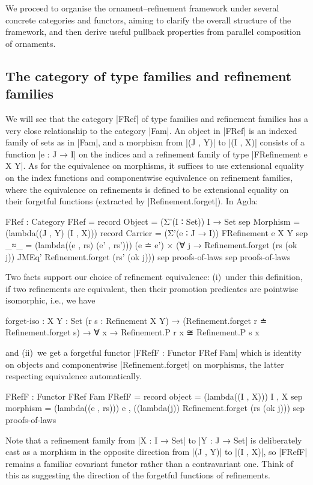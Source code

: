 We proceed to organise the ornament--refinement framework under several concrete categories and functors, aiming to clarify the overall structure of the framework, and then derive useful pullback properties from parallel composition of ornaments.

\subsection{The category of type families and refinement families}
\label{sec:FRef}

We will see that the category |FRef| of type families and refinement families has a very close relationship to the category |Fam|.
An object in |FRef| is an indexed family of sets as in |Fam|, and a morphism from |(J , Y)| to |(I , X)| consists of a function |e : J → I| on the indices and a refinement family of type |FRefinement e X Y|.
As for the equivalence on morphisms, it suffices to use extensional equality on the index functions and componentwise equivalence on refinement families, where the equivalence on refinements is defined to be extensional equality on their forgetful functions (extracted by |Refinement.forget|).
In Agda:
\begin{code}
FRef : Category
FRef = record
  {    Object    =   (Σ'(I ∶ Set)) I → Set
  sep  Morphism  =
         (lambda((J , Y) (I , X))) record
           {    Carrier  =   (Σ'(e ∶ J → I)) FRefinement e X Y
           sep  _≈_      =
                  (lambda((e , rs) (e' , rs')))
                    (e ≐ e') ×
                    (∀ j →  Refinement.forget (rs   (ok j)) JMEq'
                            Refinement.forget (rs'  (ok j)))
           sep  proofs-of-laws }
  sep  proofs-of-laws }
\end{code}
Two facts support our choice of refinement equivalence: (i)~under this definition, if two refinements are equivalent, then their promotion predicates are pointwise isomorphic, i.e., we have
\begin{code}
forget-iso :
  {X Y : Set} (r s : Refinement X Y) →
  (Refinement.forget r ≐ Refinement.forget s) →
  ∀ x → Refinement.P r x ≅ Refinement.P s x
\end{code}
and (ii)~we get a forgetful functor |FRefF : Functor FRef Fam| which is identity on objects and componentwise |Refinement.forget| on morphisms, the latter respecting equivalence automatically.
\begin{code}
FRefF : Functor FRef Fam
FRefF = record
  {    object     =  (lambda((I , X))) I , X
  sep  morphism   =
         (lambda((e , rs))) e , ((lambda({j})) Refinement.forget (rs (ok j)))
  sep  proofs-of-laws }
\end{code}
Note that a refinement family from |X : I → Set| to |Y : J → Set| is deliberately cast as a morphism in the opposite direction from |(J , Y)| to |(I , X)|, so |FRefF| remains a familiar covariant functor rather than a contravariant one.
Think of this as suggesting the direction of the forgetful functions of refinements.

